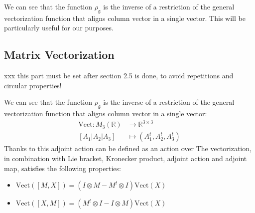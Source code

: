 
We can see that the function $\rho_{\mathfrak{g}}$ is the inverse of a restriction of the general vectorization function that aligns column vector in a single vector. This will be particularly useful for our purposes.



\subsection{Matrix Vectorization}\label{subse:vectorization}

\noindent
xxx this part must be set after section 2.5 is done, to avoid repetitions and circular properties!

\noindent
We can see that the function $\rho_{\mathfrak{g}}$ is the inverse of a restriction of the general vectorization function that aligns column vector in a single vector:
\begin{align*}
\text{Vect} : M_{3}(\mathbb{R}) & \longrightarrow \mathbb{R}^{3\times 3}  \\
[A_1 \big| A_2  \big| A_3]
&\longmapsto  
(A_1^{t}, A_2^{t} , A_3^{t})
\end{align*}
Thanks to this adjoint action can be defined as an action over 
The vectorization, in combination with Lie bracket, Kronecker product, adjoint action and adjoint map, satisfies the following properties:
\begin{itemize}
	\item $\text{Vect} ([M,X]) =  (I\otimes M - M^{t}\otimes I)\text{Vect} (X) $
	\item $\text{Vect} ([X,M]) = (M^{t}\otimes I - I\otimes M)\text{Vect} (X) $
\end{itemize}

